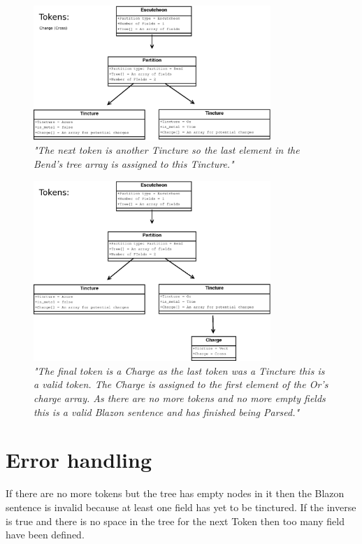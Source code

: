 \begin{figure}[H]
  \centering
    \includegraphics[width=0.8\textwidth]{parsing/images/Parsing2.eps}
  \caption{\emph{"The next token is another Tincture so the last element in the Bend's tree array is assigned to this Tincture."}}
  
\end{figure}

\begin{figure}[H]
  \centering
    \includegraphics[width=0.8\textwidth]{parsing/images/Parsing1.eps}
  \caption{\emph{"The final token is a Charge as the last token was a Tincture this is a valid token.  The Charge is assigned to the first element of the Or's charge array. As there are no more tokens and no more empty fields this is a valid Blazon sentence and has finished being Parsed."}}
  
\end{figure}







\section{Error handling}

If there are no more tokens but the tree has empty nodes in it then the Blazon sentence is invalid because at least one field has yet to be tinctured.  If the inverse is true and there is no space in the tree for the next Token then too many field have been defined.